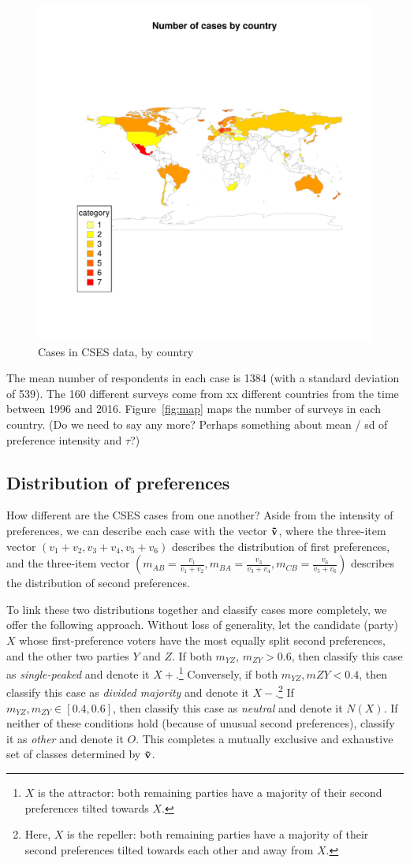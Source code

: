 \documentclass[11pt, letter]{article}
\begin{document}
\begin{figure}[!htb]
	\centering
	\includegraphics[width = .5 \textwidth]{../output/figures/case_map.pdf}
	\caption{Cases in CSES data, by country}
	\label{fig:case_map}
\end{figure}

The mean number of respondents in each case is 1384 (with a standard deviation of 539). The 160 different surveys come from xx different countries from the time between 1996 and 2016. Figure~\ref{fig:map} maps the number of surveys in each country. (Do we need to say any more? Perhaps something about mean / sd of preference intensity and $\tau$?)

\subsection{Distribution of preferences} 

How different are the CSES cases from one another? Aside from the intensity of preferences, we can describe each case with the vector $\bf \tilde{v}$, where the three-item vector $(v_1 + v_2, v_3 + v_4, v_5 + v_6)$ describes the distribution of first preferences, and the three-item vector $(m_{AB} = \frac{v_1}{v_1 + v_2}, m_{BA} = \frac{v_3}{v_3 + v_4}, m_{CB} = \frac{v_6}{v_5 + v_6})$ describes the distribution of second preferences. 

To link these two distributions together and classify cases more completely, we offer the following approach. Without loss of generality, let the candidate (party) $X$ whose first-preference voters have the most equally split second preferences, and the other two parties $Y$ and $Z$. If both $m_{YZ}$, $m_{ZY} > 0.6$, then classify this case as \emph{single-peaked} and denote it $X+$.\footnote{$X$ is the attractor: both remaining parties have a majority of their second preferences tilted towards $X$.} Conversely, if both $m_{YZ}, m{ZY} < 0.4$, then classify this case as \emph{divided majority} and denote it $X-$.\footnote{Here, $X$ is the repeller: both remaining parties have a majority of their second preferences tilted towards each other and away from $X$.} If $m_{YZ}, m_{ZY} \in [0.4, 0.6]$, then classify this case as \emph{neutral} and denote it $N(X)$. If neither of these conditions hold (because of unusual second preferences), classify it as \emph{other} and denote it $O$. This completes a mutually exclusive and exhaustive set of classes determined by $\bf \tilde{v}$.
\end{document}
